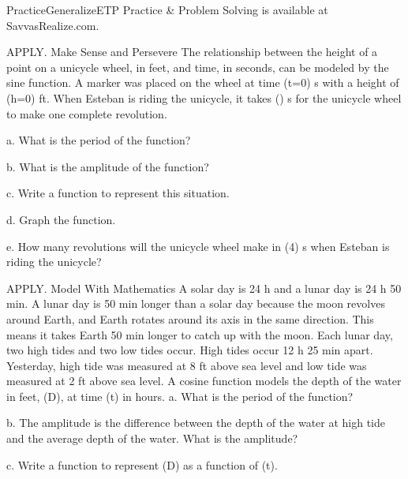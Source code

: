 \documentclass{article}
\newenvironment{practice}[2]{}{}        %
\newenvironment{te-addendum}[2]{}{}     %
\newcommand{\answer}[1]{}               %
\newcommand{\placeholder}[2]{}          %
\newcommand{\te}[1]{}                   %
\begin{document}
\begin{te-addendum}{Practice}{GeneralizeETP}
Practice \& Problem Solving is available at SavvasRealize.com.
\te{Answers14--18 printed here are incorporated in the corresponding preceding practice blocks.}
\end{te-addendum}
\begin{practice}{19}{3}
APPLY. Make Sense and Persevere The relationship between the height of a point on a unicycle wheel, in feet, and time, in seconds, can be modeled by the sine function. A marker was placed on the wheel at time (t=0) s with a height of (h=0) ft. When Esteban is riding the unicycle, it takes (\frac{}) s for the unicycle wheel to make one complete revolution.
\placeholder{illustration}{Esteban rides unicycle, orange shirt, red helmet, blue pants. Wheel has horizontal double-ended diameter arrow labeled2 ft; callout points to marker at bottom of wheel on ground: marker t=0.}
a. What is the period of the function?
\answer{a. (\frac\pi2)}
b. What is the amplitude of the function?
\answer{b. 1}
c. Write a function to represent this situation.
\answer{c. (h(t)=\sin(4t))}
d. Graph the function.
\answer{d. See graph.}
\placeholder{graph}{Printed answer19d: red h=sin4t with arrowed t,h axes and O; horizontal labels-pi,pi gridpi/4; vertical labels-1,-0.5,0.5,1 grid1/4; window-2pi to2pi,-5/4 to5/4. Eight periods of amplitude1, passing upward through origin, troughs negative; curve end arrows.}
e. How many revolutions will the unicycle wheel make in (4\pi) s when Esteban is riding the unicycle?
\answer{e. 8}
\te{Printed sine equation/graph have negative heights and rise from midline at t=0; the described ground-level starting marker on a2-foot wheel would instead have height (1-\cos4t). Source answer retained.}
\end{practice}
\begin{practice}{20}{3}
APPLY. Model With Mathematics A solar day is 24 h and a lunar day is 24 h 50 min. A lunar day is 50 min longer than a solar day because the moon revolves around Earth, and Earth rotates around its axis in the same direction. This means it takes Earth 50 min longer to catch up with the moon. Each lunar day, two high tides and two low tides occur. High tides occur 12 h 25 min apart. Yesterday, high tide was measured at 8 ft above sea level and low tide was measured at 2 ft above sea level. A cosine function models the depth of the water in feet, (D), at time (t) in hours.
a. What is the period of the function?
\answer{a. 12 h 25 min}
b. The amplitude is the difference between the depth of the water at high tide and the average depth of the water. What is the amplitude?
\answer{b. 3 ft}
c. Write a function to represent (D) as a function of (t).
\answer{c. (D(t)=3\cos(\frac{24\pi}{149}t)+5)}
\end{practice}
\end{document}
